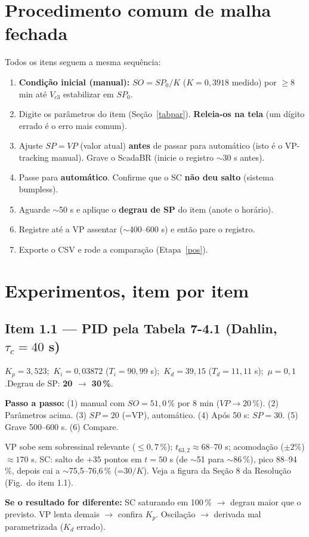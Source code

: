 \documentclass[11pt,a4paper]{article}
\newcommand{\Vc}[1]{V_{c#1}}
\begin{document}
\section{Procedimento comum de malha fechada}\label{comum}
Todos os itens seguem a mesma sequência:
\begin{enumerate}
\item \textbf{Condição inicial (manual):} $SO=SP_0/K$ ($K=0{,}3918$ medido) por $\ge8$ min até $\Vc3$ estabilizar em $SP_0$.
\item Digite os parâmetros do item (Seção~\ref{tabpar}). \textbf{Releia-os na tela} (um dígito errado é o erro mais comum).
\item Ajuste $SP=VP$ (valor atual) \textbf{antes} de passar para automático (isto é o VP-tracking manual). Grave o ScadaBR (inicie o registro $\sim$30 s antes).
\item Passe para \textbf{automático}. Confirme que o SC \textbf{não deu salto} (sistema bumpless).
\item Aguarde $\sim$50 s e aplique o \textbf{degrau de SP} do item (anote o horário).
\item Registre até a VP assentar ($\sim$400--600 s) e então pare o registro.
\item Exporte o CSV e rode a comparação (Etapa~\ref{pos}).
\end{enumerate}

\section{Experimentos, item por item}
\subsection{Item 1.1 --- PID pela Tabela 7-4.1 (Dahlin, $\tau_c=40$ s)}
\begin{parm}$K_p=3{,}523$;\ $K_i=0{,}03872$ ($T_i=90{,}99$ s);\ $K_d=39{,}15$ ($T_d=11{,}11$ s);\ $\mu=0{,}1$.\quad Degrau de SP: \textbf{20 $\to$ 30\,\%}.\end{parm}
\textbf{Passo a passo:} (1) manual com $SO=51{,}0\,\%$ por 8 min ($VP\to20\,\%$). (2) Parâmetros acima. (3) $SP=20$ (=VP), automático. (4) Após 50 s: $SP=30$. (5) Grave 500--600 s. (6) Compare.
\begin{esp}VP sobe sem sobressinal relevante ($\le0{,}7\,\%$); $t_{63,2}\approx68$--70 s; acomodação ($\pm2\%$) $\approx170$ s. SC: salto de $+35$ pontos em $t=50$ s (de $\sim$51 para $\sim$86\,\%), pico 88--94\,\%, depois cai a $\sim$75,5--76,6\,\% (=$30/K$). Veja a figura da Seção 8 da Resolução (Fig.\ do item 1.1).\end{esp}
\textbf{Se o resultado for diferente:} SC saturando em 100\,\% $\to$ degrau maior que o previsto. VP lenta demais $\to$ confira $K_p$. Oscilação $\to$ derivada mal parametrizada ($K_d$ errado).
\end{document}

